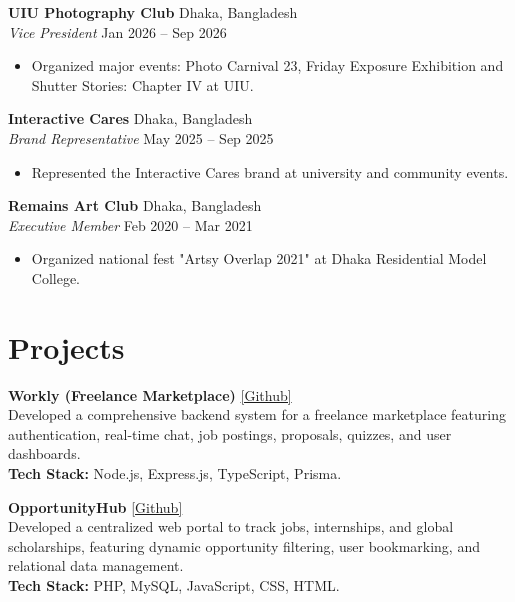 \documentclass[10pt,a4paper]{article}
\begin{document}
\textbf{UIU Photography Club} \hfill Dhaka, Bangladesh\\
\textit{Vice President} \hfill Jan 2026 -- Sep 2026
\begin{itemize}
    \item Organized major events: Photo Carnival 23, Friday Exposure Exhibition and Shutter Stories: Chapter IV at UIU.
\end{itemize}
\vspace{2mm}

\textbf{Interactive Cares} \hfill Dhaka, Bangladesh \\
\textit{Brand Representative} \hfill May 2025 -- Sep 2025
\begin{itemize}
    \item Represented the Interactive Cares brand at university and community events.
\end{itemize}
\vspace{2mm} 

\textbf{Remains Art Club} \hfill Dhaka, Bangladesh \\
\textit{Executive Member} \hfill Feb 2020 -- Mar 2021
\begin{itemize}
    \item Organized national fest "Artsy Overlap 2021" at Dhaka Residential Model College.
\end{itemize}

\section*{Projects}
\textbf{Workly (Freelance Marketplace)} \hfill \href{https://github.com/mdzobaerahmed/Workly}{[Github]}\\
Developed a comprehensive backend system for a freelance marketplace featuring authentication, real-time chat, job postings, proposals, quizzes, and user dashboards.\\
\textbf{Tech Stack:} Node.js, Express.js, TypeScript, Prisma.
\vspace{2mm}

\textbf{OpportunityHub} \hfill \href{https://github.com/mdzobaerahmed/OpportunityHub}{[Github]}\\
Developed a centralized web portal to track jobs, internships, and global scholarships, featuring dynamic opportunity filtering, user bookmarking, and relational data management.\\
\textbf{Tech Stack:} PHP, MySQL, JavaScript, CSS, HTML.
\vspace{2mm}
\end{document}
